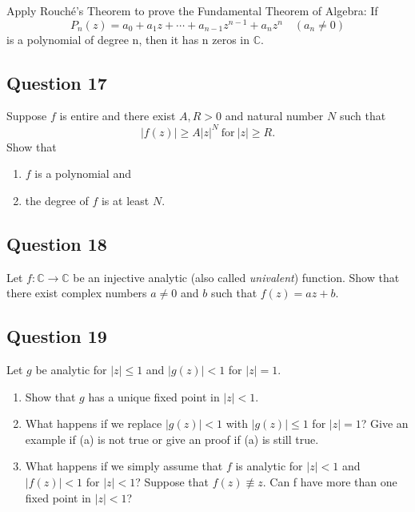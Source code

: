 \documentclass[12pt]{article}
\begin{document}
Apply Rouché's Theorem to prove the Fundamental Theorem of Algebra: If
\[P_n(z) = a_0 + a_1z + \cdots + a_{n-1}z^{n-1} + a_nz^n\quad  (a_n \neq 0)\]
is a polynomial of degree n, then it has n zeros in \(\mathbb C\).

\hypertarget{question-17-2}{%
\subsection{Question 17}\label{question-17-2}}

Suppose \(f\) is entire and there exist \(A, R >0\) and natural number
\(N\) such that \[|f(z)| \geq A |z|^N\ \text{for}\ |z| \geq R.\] Show
that

\begin{enumerate}
\def\labelenumi{(\roman{enumi})}
\item
  \(f\) is a polynomial and
\item
  the degree of \(f\) is at least \(N\).
\end{enumerate}

\hypertarget{question-18-2}{%
\subsection{Question 18}\label{question-18-2}}

Let \(f: {\mathbb C} \rightarrow {\mathbb C}\) be an injective analytic
(also called \emph{univalent}) function. Show that there exist complex
numbers \(a \neq 0\) and \(b\) such that \(f(z) = az + b\).

\hypertarget{question-19-2}{%
\subsection{Question 19}\label{question-19-2}}

Let \(g\) be analytic for \(|z|\leq 1\) and \(|g(z)| < 1\) for
\(|z| = 1\).

\begin{enumerate}
\def\labelenumi{\arabic{enumi}.}
\item
  Show that \(g\) has a unique fixed point in \(|z| < 1\).
\item
  What happens if we replace \(|g(z)| < 1\) with \(|g(z)|\leq 1\) for
  \(|z|=1\)? Give an example if (a) is not true or give an proof if (a)
  is still true.
\item
  What happens if we simply assume that \(f\) is analytic for
  \(|z| < 1\) and \(|f(z)| < 1\) for \(|z| < 1\)? Suppose that
  \(f(z) \not\equiv z\). Can f have more than one fixed point in
  \(|z| < 1\)?
\end{enumerate}
\end{document}
